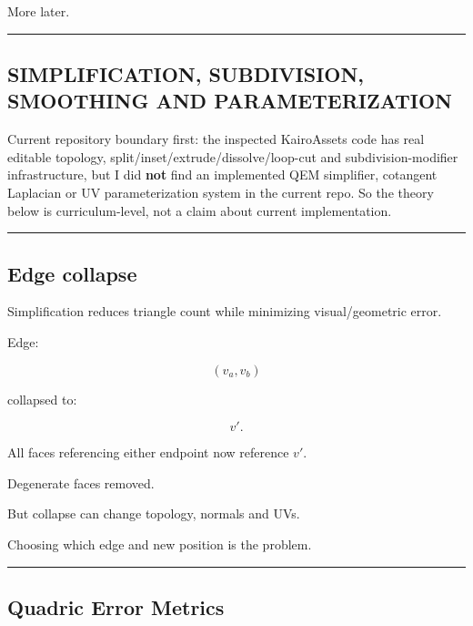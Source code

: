 More later.

\begin{center}\rule{0.5\linewidth}{0.5pt}\end{center}

\subsection{SIMPLIFICATION, SUBDIVISION, SMOOTHING AND PARAMETERIZATION}\label{04-visual-computing-ii-ch041-simplification-subdivision-smoothing-and-parameterization}

\hypertarget{04-visual-computing-ii-ch041-simplification-subdivision-smoothing-and-parameterization}{}

Current repository boundary first: the inspected KairoAssets code has real editable topology, split/inset/extrude/dissolve/loop-cut and subdivision-modifier infrastructure, but I did \textbf{not} find an implemented QEM simplifier, cotangent Laplacian or UV parameterization system in the current repo. So the theory below is curriculum-level, not a claim about current implementation.

\begin{center}\rule{0.5\linewidth}{0.5pt}\end{center}

\subsection{Edge collapse}\label{04-visual-computing-ii-ch041-edge-collapse}

\hypertarget{04-visual-computing-ii-ch041-edge-collapse}{}

Simplification reduces triangle count while minimizing visual/geometric error.

Edge:

\[
(v_a,v_b)
\]

collapsed to:

\[
v'.
\]

All faces referencing either endpoint now reference \(v'\).

Degenerate faces removed.

But collapse can change topology, normals and UVs.

Choosing which edge and new position is the problem.

\begin{center}\rule{0.5\linewidth}{0.5pt}\end{center}

\subsection{Quadric Error Metrics}\label{04-visual-computing-ii-ch041-quadric-error-metrics}

